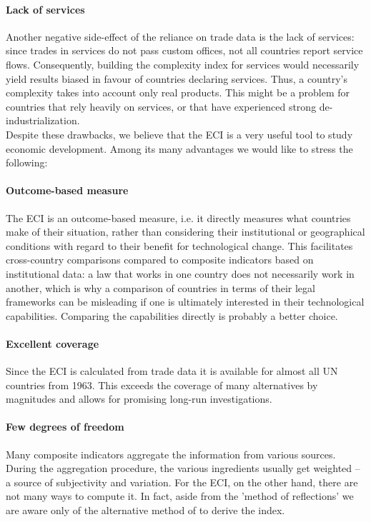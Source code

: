 \documentclass[abstract=on]{scrartcl}
\begin{document}
\paragraph{Lack of services} 
Another negative side-effect of the reliance on trade data is the lack of services:
since trades in services do not pass custom offices, not all countries report service flows. 
Consequently, building the complexity index for services would necessarily yield results biased in favour of countries declaring services.
Thus, a country's complexity takes into account only real products. 
This might be a problem for countries that rely heavily on services, or that have experienced strong de-industrialization.\\

Despite these drawbacks, we believe that the ECI is a very useful tool to study economic development. 
Among its many advantages we would like to stress the following:

\paragraph{Outcome-based measure}
The ECI is an outcome-based measure, i.e. it directly measures what countries make of their situation, rather than considering their institutional or geographical conditions with regard to their benefit for technological change.
This facilitates cross-country comparisons compared to composite indicators based on institutional data:
a law that works in one country does not necessarily work in another, which is why a comparison of countries in terms of their legal frameworks can be misleading if one is ultimately interested in their technological capabilities.
Comparing the capabilities directly is probably a better choice.

\paragraph{Excellent coverage}
Since the ECI is calculated from trade data it is available for almost all UN countries from 1963. 
This exceeds the coverage of many alternatives by magnitudes and allows for promising long-run investigations.

\paragraph{Few degrees of freedom} 
Many composite indicators aggregate the information from various sources.
During the aggregation procedure, the various ingredients usually get weighted -- a source of subjectivity and variation.
For the ECI, on the other hand, there are not many ways to compute it.
In fact, aside from the 'method of reflections' we are aware only of the alternative method of \citet{Tacchella:2013ko} to derive the index.
\end{document}
